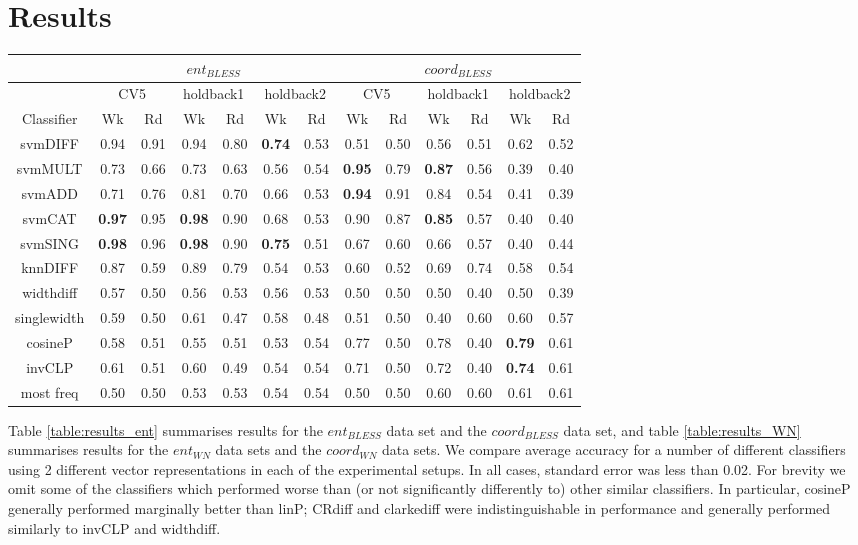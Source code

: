 \documentclass[11pt]{article}
\begin{document}
\section{Results}
\label{sect:results}

\begin{table*}[ht]
\centering
\begin{tabular}{|c|c|c|c|c|c|c||c|c|c|c|c|c|}
\hline
&\multicolumn{6}{|c||}{$ent_{BLESS}$}&\multicolumn{6}{|c|}{$coord_{BLESS}$}\\
\hline
&\multicolumn{2}{|c|}{CV5}&\multicolumn{2}{|c|}{holdback1}&\multicolumn{2}{|c||}{holdback2}&\multicolumn{2}{|c|}{CV5}&\multicolumn{2}{|c|}{holdback1}&\multicolumn{2}{|c|}{holdback2}\\
\hline
Classifier&Wk&Rd&Wk&Rd&Wk&Rd&Wk&Rd&Wk&Rd&Wk&Rd\\
\hline
svmDIFF&0.94&0.91&0.94&0.80&\textbf{0.74}&0.53&0.51&0.50&0.56&0.51&0.62&0.52\\
svmMULT&0.73&0.66&0.73&0.63&0.56&0.54&\textbf{0.95}&0.79&\textbf{0.87}&0.56&0.39&0.40\\
svmADD&0.71&0.76&0.81&0.70&0.66&0.53&\textbf{0.94}&0.91&0.84&0.54&0.41&0.39\\
svmCAT&\textbf{0.97}&0.95&\textbf{0.98}&0.90&0.68&0.53&0.90&0.87&\textbf{0.85}&0.57&0.40&0.40\\
svmSING&\textbf{0.98}&0.96&\textbf{0.98}&0.90&\textbf{0.75}&0.51&0.67&0.60&0.66&0.57&0.40&0.44\\
knnDIFF&0.87&0.59&0.89&0.79&0.54&0.53&0.60&0.52&0.69&0.74&0.58&0.54\\
\hline
widthdiff&0.57&0.50&0.56&0.53&0.56&0.53&0.50&0.50&0.50&0.40&0.50&0.39\\
singlewidth&0.59&0.50&0.61&0.47&0.58&0.48&0.51&0.50&0.40&0.60&0.60&0.57\\
cosineP&0.58&0.51&0.55&0.51&0.53&0.54&0.77&0.50&0.78&0.40&\textbf{0.79}&0.61\\
invCLP&0.61&0.51&0.60&0.49&0.54&0.54&0.71&0.50&0.72&0.40&\textbf{0.74}&0.61\\
most freq&0.50&0.50&0.53&0.53&0.54&0.54&0.50&0.50&0.60&0.60&0.61&0.61\\
\hline
\end{tabular}
\caption{Accuracy Figures for the \emph{$ent_{BLESS}$} and \emph{$coord_{BLESS}$} data sets using the 3 different experimental setups (Errors $< $0.02)}
\label{table:results_ent}
\end{table*}

Table \ref{table:results_ent} summarises results for the $ent_{BLESS}$ data set and the $coord_{BLESS}$ data set, and table \ref{table:results_WN} summarises results for the $ent_{WN}$ data sets and the $coord_{WN}$ data sets.  We compare average accuracy for a number of different classifiers using 2 different vector representations in each of the experimental setups.  In all cases, standard error was less than 0.02.  For brevity we omit some of the classifiers which performed worse than (or not significantly differently to) other similar classifiers.  In particular, cosineP generally performed marginally better than linP; CRdiff and clarkediff were indistinguishable in performance and generally performed similarly to invCLP and widthdiff.
\end{document}
